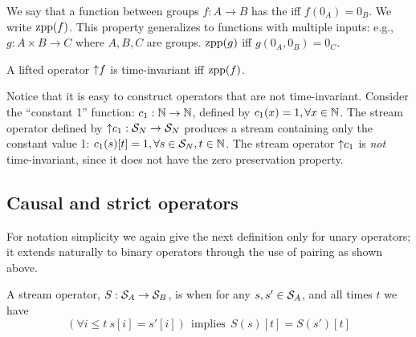 \begin{definition}
We say that a function between groups $f: A \to B$ has the  iff $f(0_A) = 0_B$.  We write $\mbox{zpp}(f)$.  This property generalizes to functions
with multiple inputs: e.g., $g: A \times B \to C$ where $A, B, C$ are groups.  $\mbox{zpp}(g)$ 
iff $g(0_A, 0_B) = 0_C$.
\end{definition}

\begin{proposition}
A lifted operator ${\uparrow}f$ is time-invariant iff $\mbox{zpp}(f)$. 
\end{proposition}

Notice that it is easy to construct operators that are not time-invariant.
Consider the ``constant 1'' function: $c_1: \mathbb{N} \rightarrow \mathbb{N}$, defined by 
$c_1(x) = 1, \forall x \in \mathbb{N}$.
The stream operator defined by ${\uparrow}c_1: \mathcal{S}_{N} \rightarrow \mathcal{S}_{N}$ 
produces a stream containing only the constant value 1: $c_1(s)[t] = 1, 
\forall s \in \mathcal{S}_{N}, t \in \mathbb{N}$.  The stream operator ${\uparrow}c_1$
is \emph{not} time-invariant, since it does not have the zero preservation property.

\begin{comment}
\begin{definition}
We call an operator $o: \stream{A} \rightarrow \stream{B}$ over streams 
\defined{memoryless} if it can be produced by lifting a function pointwise, i.e., 
there exists a function $f: A \rightarrow B$ such that 
$\forall s \in \stream{A} . o(s)[t] = f(s[t])$.

\begin{example}
Whatever definition we give to ``memoryless'' it should be the case that 
any memoryless operator is causal. 
\end{example}
\end{definition}
\end{comment}

\subsection{Causal and strict operators}\label{sec:causal}

For notation simplicity we again give the next definition only for unary operators;
it extends naturally to binary operators through the use of pairing as shown above.

\begin{definition}[Causality]
A stream operator, $S:\mathcal{S}_{A}\to\mathcal{S}_{B}$,
is  when for any $s,s'\in\mathcal{S}_{A}$,
and all times $t$ we have 
$$
(\forall i\leq t~s[i]=s'[i]) ~~\text{implies}~~ S(s)[t]=S(s')[t]
$$
\end{definition}

